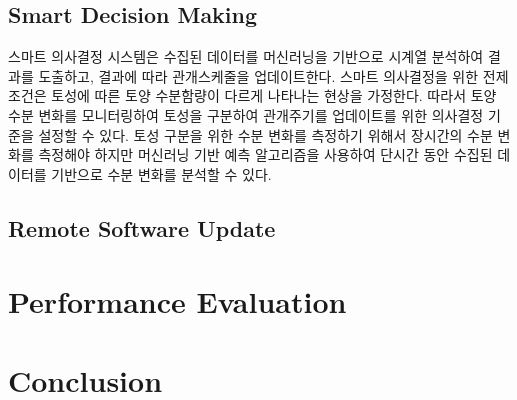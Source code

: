 \documentclass[11pt]{article}
\begin{document}
\subsection{Smart Decision Making}
스마트 의사결정 시스템은 수집된 데이터를 머신러닝을 기반으로 시계열 분석하여 결과를 도출하고, 결과에 따라 관개스케줄을 업데이트한다. 스마트 의사결정을 위한 전제조건은 토성에 따른 토양 수분함량이 다르게 나타나는 현상을 가정한다. 따라서 토양 수분 변화를 모니터링하여 토성을 구분하여 관개주기를 업데이트를 위한 의사결정 기준을 설정할 수 있다. 토성 구분을 위한 수분 변화를 측정하기 위해서 장시간의 수분 변화를 측정해야 하지만 머신러닝 기반 예측 알고리즘을 사용하여 단시간 동안 수집된 데이터를 기반으로 수분 변화를 분석할 수 있다. 

\subsection{Remote Software Update}

\section{Performance Evaluation}

\section{Conclusion}
\end{document}
